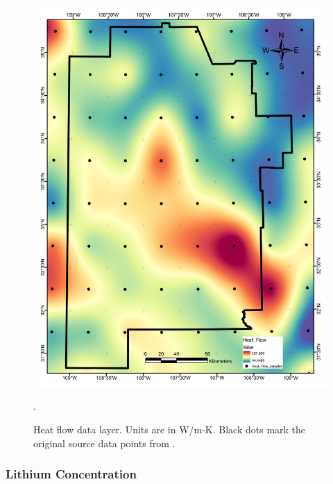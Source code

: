 \begin{figure}[!htp]
\centering
\includegraphics[scale=.50]{templates/images/Figure-HeatFlow.pdf}
\caption[Heat flow data layer]{Heat flow data layer. Units are in W/m-K. Black dots mark the original source data points from \protect\citep{lucazeau_analysis_2019}.}.
\label{fig:feat_heatflow}
\end{figure}

\subsubsection{Lithium Concentration}

